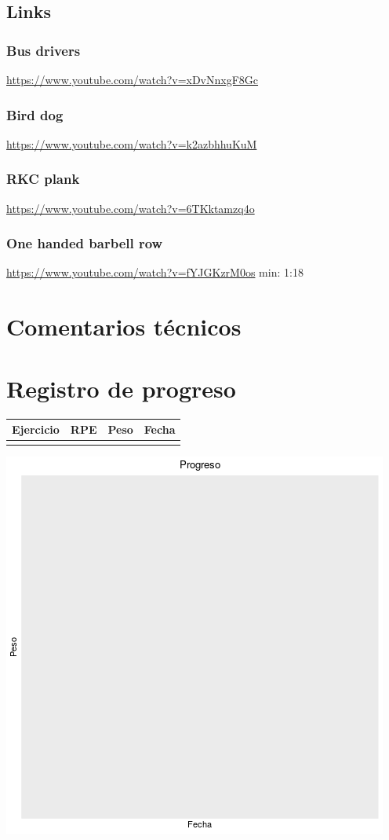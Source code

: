 \documentclass[11pt]{article}
\begin{document}
\subsection{Links}
\label{sec:orgbfc8701}
\subsubsection{Bus drivers}
\label{sec:org1c19e42}
\url{https://www.youtube.com/watch?v=xDvNnxgF8Gc}
\subsubsection{Bird dog}
\label{sec:org59f7f10}
\url{https://www.youtube.com/watch?v=k2azbhhuKuM}
\subsubsection{RKC plank}
\label{sec:org2bad62f}
\url{https://www.youtube.com/watch?v=6TKktamzq4o}
\subsubsection{One handed barbell row}
\label{sec:org27f7580}
\url{https://www.youtube.com/watch?v=fYJGKzrM0os} min: 1:18

\section{Comentarios técnicos}
\label{sec:orgd47fc40}
\section{Registro de progreso}
\label{sec:org229ee7b}
\begin{center}
\label{tab:orgafb235a}
\begin{tabular}{llll}
Ejercicio & RPE & Peso & Fecha\\
\hline
 &  &  & \\
\end{tabular}
\end{center}
\begin{center}
\includegraphics[width=.9\linewidth]{tmp.png}
\end{center}
\end{document}
